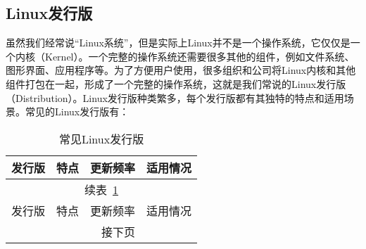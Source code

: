 \documentclass[../main.tex]{subfiles}
\begin{document}
\subsection{Linux发行版}

虽然我们经常说“Linux系统”，但是实际上Linux并不是一个操作系统，它仅仅是一个内核（Kernel）。一个完整的操作系统还需要很多其他的组件，例如文件系统、图形界面、应用程序等。为了方便用户使用，很多组织和公司将Linux内核和其他组件打包在一起，形成了一个完整的操作系统，这就是我们常说的Linux发行版（Distribution）。Linux发行版种类繁多，每个发行版都有其独特的特点和适用场景。常见的Linux发行版有：
\begin{small}
  \begin{longtable}[c]{l|lll}
    \caption{常见Linux发行版}\label{tab:linux-distros}\\
    \toprule
    发行版 & 特点 & 更新频率 & 适用情况 \\
    \midrule
    \endfirsthead          %

    \multicolumn{4}{c}{\footnotesize 续表~\ref{tab:linux-distros}}\\[.5ex]
    \toprule
    发行版 & 特点 & 更新频率 & 适用情况 \\
    \midrule
    \endhead               %

    \midrule
    \multicolumn{3}{r}{\footnotesize 接下页}
    \endfoot               %

    \bottomrule
    \endlastfoot


\end{longtable}
\end{small}
\end{document}
